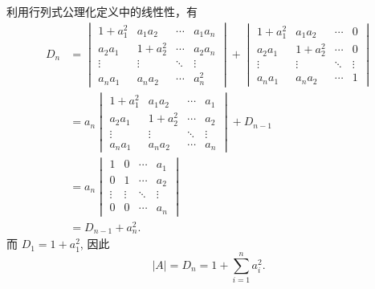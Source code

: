 \documentclass[UTF8,12pt,a4paper,fontset=fandol]{ctexart}
\begin{document}
\begin{solve}
            利用行列式公理化定义中的线性性，有
            \begin{align*}
                D_n &= \begin{vmatrix}
                    1+a_1^2 & a_1a_2  & \cdots & a_1a_n  \\
                    a_2a_1  & 1+a_2^2 & \cdots & a_2a_n  \\
                    \vdots  & \vdots  & \ddots & \vdots  \\
                    a_na_1  & a_na_2  & \cdots & a_n^2
                \end{vmatrix} + \begin{vmatrix}
                    1+a_1^2 & a_1a_2  & \cdots & 0       \\
                    a_2a_1  & 1+a_2^2 & \cdots & 0       \\
                    \vdots  & \vdots  & \ddots & \vdots  \\
                    a_na_1  & a_na_2  & \cdots & 1
                \end{vmatrix} \\
                &= a_n \begin{vmatrix}
                    1+a_1^2 & a_1a_2  & \cdots & a_1     \\
                    a_2a_1  & 1+a_2^2 & \cdots & a_2     \\
                    \vdots  & \vdots  & \ddots & \vdots  \\
                    a_na_1  & a_na_2  & \cdots & a_n
                \end{vmatrix} + D_{n-1} \\
                &= a_n \begin{vmatrix}
                    1      & 0      & \cdots & a_1     \\
                    0      & 1      & \cdots & a_2     \\
                    \vdots & \vdots & \ddots & \vdots  \\
                    0      & 0      & \cdots & a_n
                \end{vmatrix} \\
                &= D_{n-1} + a_n^2.
            \end{align*}
            而 $D_1 = 1 + a_1^2$, 因此
            \[
                |A| = D_n = 1 + \sum_{i=1}^n a_i^2.
            \]
\end{solve}
\end{document}
